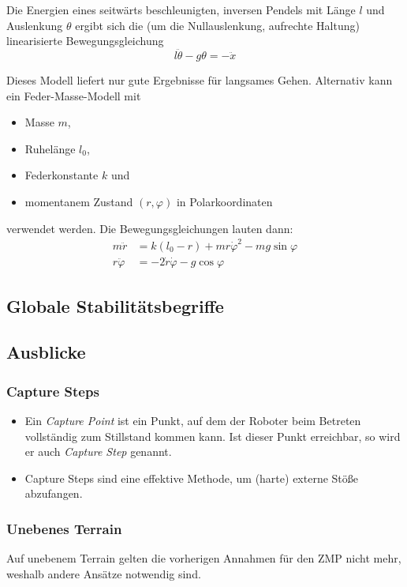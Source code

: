 			Die Energien eines seitwärts beschleunigten, inversen Pendels mit Länge \(l\) und Auslenkung \(\theta\) ergibt sich die (um die Nullauslenkung, \dh aufrechte Haltung) linearisierte Bewegungsgleichung
			\begin{equation*}
				l \ddot{\theta} - g \theta = -\ddot{x}
			\end{equation*}
			
			Dieses Modell liefert nur gute Ergebnisse für langsames Gehen. Alternativ kann ein Feder-Masse-Modell mit
			\begin{itemize}
				\item Masse \(m\),
				\item Ruhelänge \(l_0\),
				\item Federkonstante \(k\) und
				\item momentanem Zustand \( (r, \varphi) \) in Polarkoordinaten
			\end{itemize}
			verwendet werden. Die Bewegungsgleichungen lauten dann:
			\begin{align*}
				m\ddot{r} &= k(l_0 - r) + mr\dot{\varphi}^2 - mg\sin\varphi \\
				r\ddot{\varphi} &= -2\dot{r}\dot{\varphi} - g\cos\varphi
			\end{align*}
		
		\subsection{Globale Stabilitätsbegriffe} %

		\subsection{Ausblicke}
			\subsubsection{Capture Steps}
				\begin{itemize}
					\item Ein \emph{Capture Point} ist ein Punkt, auf dem der Roboter beim Betreten vollständig zum Stillstand kommen kann. Ist dieser Punkt erreichbar, so wird er auch \emph{Capture Step} genannt.
					\item Capture Steps sind eine effektive Methode, um (harte) externe Stöße abzufangen.
				\end{itemize}

			\subsubsection{Unebenes Terrain}
				Auf unebenem Terrain gelten die vorherigen Annahmen für den ZMP nicht mehr, weshalb andere Ansätze notwendig sind.

